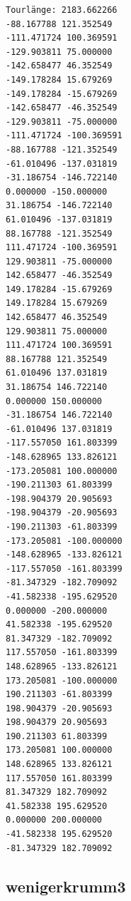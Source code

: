 \documentclass[a4paper, 10pt, ngerman]{article}
\begin{document}
\begin{verbatim}
Tourlänge: 2183.662266
-88.167788 121.352549
-111.471724 100.369591
-129.903811 75.000000
-142.658477 46.352549
-149.178284 15.679269
-149.178284 -15.679269
-142.658477 -46.352549
-129.903811 -75.000000
-111.471724 -100.369591
-88.167788 -121.352549
-61.010496 -137.031819
-31.186754 -146.722140
0.000000 -150.000000
31.186754 -146.722140
61.010496 -137.031819
88.167788 -121.352549
111.471724 -100.369591
129.903811 -75.000000
142.658477 -46.352549
149.178284 -15.679269
149.178284 15.679269
142.658477 46.352549
129.903811 75.000000
111.471724 100.369591
88.167788 121.352549
61.010496 137.031819
31.186754 146.722140
0.000000 150.000000
-31.186754 146.722140
-61.010496 137.031819
-117.557050 161.803399
-148.628965 133.826121
-173.205081 100.000000
-190.211303 61.803399
-198.904379 20.905693
-198.904379 -20.905693
-190.211303 -61.803399
-173.205081 -100.000000
-148.628965 -133.826121
-117.557050 -161.803399
-81.347329 -182.709092
-41.582338 -195.629520
0.000000 -200.000000
41.582338 -195.629520
81.347329 -182.709092
117.557050 -161.803399
148.628965 -133.826121
173.205081 -100.000000
190.211303 -61.803399
198.904379 -20.905693
198.904379 20.905693
190.211303 61.803399
173.205081 100.000000
148.628965 133.826121
117.557050 161.803399
81.347329 182.709092
41.582338 195.629520
0.000000 200.000000
-41.582338 195.629520
-81.347329 182.709092 
\end{verbatim}

\subsection*{wenigerkrumm3}
\end{document}

